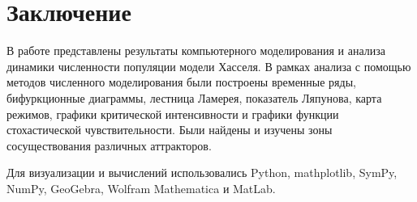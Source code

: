 \section{Заключение}

    В работе представлены результаты компьютерного моделирования и анализа динамики численности популяции модели Хасселя. В рамках анализа с помощью методов численного моделирования были построены временные ряды, бифуркционные диаграммы, лестница Ламерея, показатель Ляпунова, карта режимов, графики критической интенсивности и графики функции стохастической чувствительности. Были найдены и изучены зоны сосуществования различных аттракторов. 

    Для визуализации и вычислений использовались Python, mathplotlib, SymPy, NumPy, GeoGebra, Wolfram Mathematica и MatLab.

